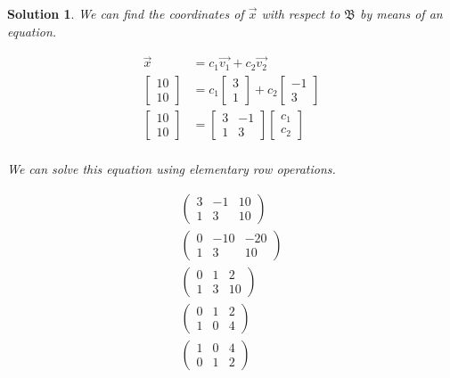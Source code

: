 \documentclass{article}
\newtheorem*{solution}{Solution}
\begin{document}
\begin{solution}
We can find the coordinates of $\vec{x}$ with respect to $\mathfrak{B}$ by means of an equation.

\begin{align*}
\vec{x} &= c_{1} \vec{v_{1}} + c_{2} \vec{v_{2}} \\
\begin{bmatrix} 10 \\ 10 \end{bmatrix} &= c_{1} \begin{bmatrix}3 \\ 1 \end{bmatrix} + c_{2} \begin{bmatrix} -1 \\ 3 \end{bmatrix} \\
\begin{bmatrix} 10 \\ 10 \end{bmatrix} &= \begin{bmatrix}3 & -1 \\ 1 & 3 \end{bmatrix} \begin{bmatrix} c_{1} \\ c_{2} \end{bmatrix} \\
\end{align*}

We can solve this equation using elementary row operations.

\begin{align*}
\left( \begin{array}{cc|c}
3 & -1 & 10 \\
1 & 3 & 10
\end{array} \right) \\
\left( \begin{array}{cc|c}
0 & -10 & -20 \\
1 & 3 & 10
\end{array} \right) \\
\left( \begin{array}{cc|c}
0 & 1 & 2 \\
1 & 3 & 10
\end{array} \right) \\
\left( \begin{array}{cc|c}
0 & 1 & 2 \\
1 & 0 & 4
\end{array} \right) \\
\left( \begin{array}{cc|c}
1 & 0 & 4 \\
0 & 1 & 2 
\end{array} \right) \\
\end{align*}


\end{solution}
\end{document}
